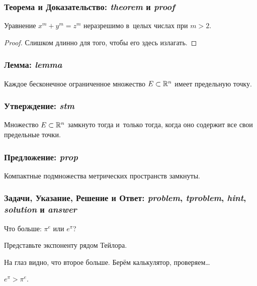 \documentclass[a4paper]{article}
\begin{document}
\subsubsection{Теорема и Доказательство: \emph{theorem} и \emph{proof}}
\begin{theorem}[Ферма]
Уравнение $x^m+y^m=z^m$ неразрешимо в~целых числах при $m>2$.
\end{theorem}
\begin{proof}
Слишком длинно для того, чтобы его здесь излагать.
\end{proof}

\subsubsection{Лемма: \emph{lemma}}
\begin{lemma}
Каждое бесконечное ограниченное множество $E \subset \mathbb{R}^n$ имеет предельную точку.
\end{lemma}

\subsubsection{Утверждение: \emph{stm}}
\begin{stm}
Множество $E \subset \mathbb{R}^n$ замкнуто тогда и~только тогда, когда оно содержит все свои предельные точки.
\end{stm}

\subsubsection{Предложение: \emph{prop}}
\begin{prop}
Компактные подмножества метрических пространств замкнуты.
\end{prop}

\subsubsection{Задачи, Указание, Решение и Ответ: \emph{problem}, \emph{tproblem},
\emph{hint}, \emph{solution} и \emph{answer}}
\begin{problem}
Что больше: $\pi^e$ или $e^\pi$?
\end{problem}
\begin{hint}
Представьте экспоненту рядом Тейлора.
\end{hint}
\begin{solution}
На глаз видно, что второе больше. Берём калькулятор, проверяем\ldots
\end{solution}
\begin{answer}
$e^\pi > \pi^e$.
\end{answer}
\end{document}
